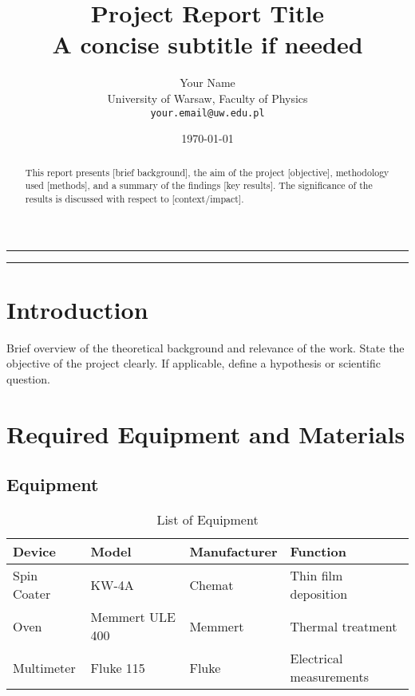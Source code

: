 \documentclass[12pt,a4paper]{article}
\title{\textbf{Project Report Title}\\ \large A concise subtitle if needed}
\author{Your Name \\
\small University of Warsaw, Faculty of Physics \\
\small \texttt{your.email@uw.edu.pl}}
\date{\today}
\begin{document}
\maketitle
\hrule
\vspace{1em}

\begin{abstract}
\noindent
This report presents [brief background], the aim of the project [objective], methodology used [methods], and a summary of the findings [key results]. The significance of the results is discussed with respect to [context/impact].
\end{abstract}

\vspace{1em}
\hrule
\vspace{1.5em}


\section{Introduction}
Brief overview of the theoretical background and relevance of the work. State the objective of the project clearly. If applicable, define a hypothesis or scientific question.

\section{Required Equipment and Materials}

\subsection{Equipment}
\begin{table}[H]
    \centering
    \caption{List of Equipment}
    \begin{tabular}{@{}llll@{}}
        \toprule
        \textbf{Device} & \textbf{Model} & \textbf{Manufacturer} & \textbf{Function} \\
        \midrule
        Spin Coater & KW-4A & Chemat & Thin film deposition \\
        Oven & Memmert ULE 400 & Memmert & Thermal treatment \\
        Multimeter & Fluke 115 & Fluke & Electrical measurements \\
        \bottomrule
    \end{tabular}
\end{table}
\end{document}
